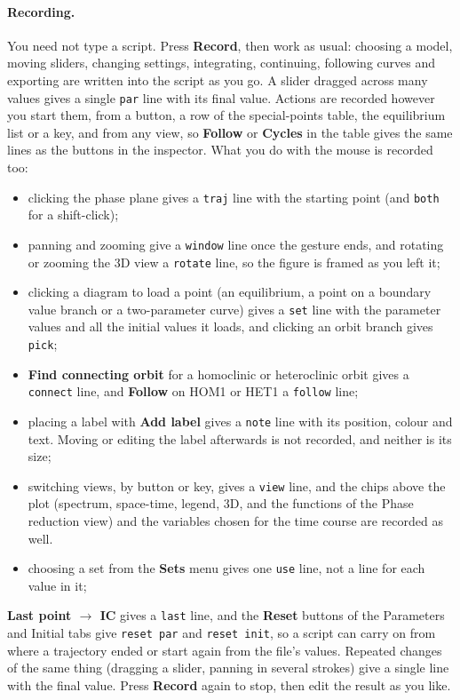 \documentclass[11pt,a4paper]{article}
\newcommand{\ui}[1]{\textsf{\textbf{#1}}}          %
\begin{document}
\paragraph{Recording.} You need not type a script. Press \ui{Record}, then work as usual: choosing a model, moving sliders, changing settings, integrating, continuing, following curves and exporting are written into the script as you go. A slider dragged across many values gives a single \texttt{par} line with its final value. Actions are recorded however you start them, from a button, a row of the special-points table, the equilibrium list or a key, and from any view, so \ui{Follow} or \ui{Cycles} in the table gives the same lines as the buttons in the inspector. What you do with the mouse is recorded too:
\begin{itemize}
  \item clicking the phase plane gives a \texttt{traj} line with the starting point (and \texttt{both} for a shift-click);
  \item panning and zooming give a \texttt{window} line once the gesture ends, and rotating or zooming the 3D view a \texttt{rotate} line, so the figure is framed as you left it;
  \item clicking a diagram to load a point (an equilibrium, a point on a boundary value branch or a two-parameter curve) gives a \texttt{set} line with the parameter values and all the initial values it loads, and clicking an orbit branch gives \texttt{pick};
  \item \ui{Find connecting orbit} for a homoclinic or heteroclinic orbit gives a \texttt{connect} line, and \ui{Follow} on HOM1 or HET1 a \texttt{follow} line;
  \item placing a label with \ui{Add label} gives a \texttt{note} line with its position, colour and text. Moving or editing the label afterwards is not recorded, and neither is its size;
  \item switching views, by button or key, gives a \texttt{view} line, and the chips above the plot (spectrum, space-time, legend, 3D, and the functions of the Phase reduction view) and the variables chosen for the time course are recorded as well.
  \item choosing a set from the \ui{Sets} menu gives one \texttt{use} line, not a line for each value in it;
\end{itemize}
\ui{Last point $\to$ IC} gives a \texttt{last} line, and the \ui{Reset} buttons of the Parameters and Initial tabs give \texttt{reset par} and \texttt{reset init}, so a script can carry on from where a trajectory ended or start again from the file's values. Repeated changes of the same thing (dragging a slider, panning in several strokes) give a single line with the final value. Press \ui{Record} again to stop, then edit the result as you like.
\end{document}
